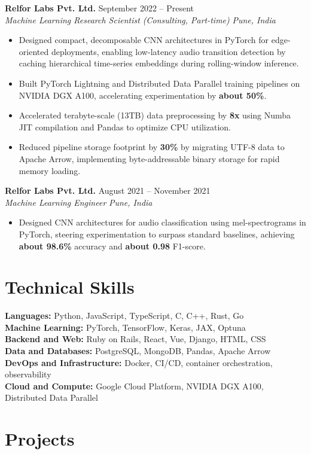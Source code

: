 \documentclass[10pt,a4paper]{article}
\newcommand{\resumeheading}[4]{%
  \textbf{#1} \hfill #2\\[-0.15em]
  \textit{#3} \hfill \textit{#4}\\[-1.5em]
}
\begin{document}
\resumeheading{Relfor Labs Pvt. Ltd.}{September 2022 -- Present}{Machine Learning Research Scientist (Consulting, Part-time)}{Pune, India}
\begin{itemize}
	\item Designed compact, decomposable CNN architectures in PyTorch for edge-oriented deployments, enabling low-latency audio transition detection by caching hierarchical time-series embeddings during rolling-window inference.
	\item Built PyTorch Lightning and Distributed Data Parallel training pipelines on NVIDIA DGX A100, accelerating experimentation by \textbf{about 50\%}.
	\item Accelerated terabyte-scale (13TB) data preprocessing by \textbf{8x} using Numba JIT compilation and Pandas to optimize CPU utilization.
	\item Reduced pipeline storage footprint by \textbf{30\%} by migrating UTF-8 data to Apache Arrow, implementing byte-addressable binary storage for rapid memory loading.
\end{itemize}

\resumeheading{Relfor Labs Pvt. Ltd.}{August 2021 -- November 2021}{Machine Learning Engineer}{Pune, India}
\begin{itemize}
	\item Designed CNN architectures for audio classification using mel-spectrograms in PyTorch, steering experimentation to surpass standard baselines, achieving \textbf{about 98.6\%} accuracy and \textbf{about 0.98} F1-score.
\end{itemize}


\section*{Technical Skills}
\textbf{Languages:} Python, JavaScript, TypeScript, C, C++, Rust, Go\\
\textbf{Machine Learning:} PyTorch, TensorFlow, Keras, JAX, Optuna\\
\textbf{Backend and Web:} Ruby on Rails, React, Vue, Django, HTML, CSS\\
\textbf{Data and Databases:} PostgreSQL, MongoDB, Pandas, Apache Arrow\\
\textbf{DevOps and Infrastructure:} Docker, CI/CD, container orchestration, observability\\
\textbf{Cloud and Compute:} Google Cloud Platform, NVIDIA DGX A100, Distributed Data Parallel

\section*{Projects}
\end{document}
